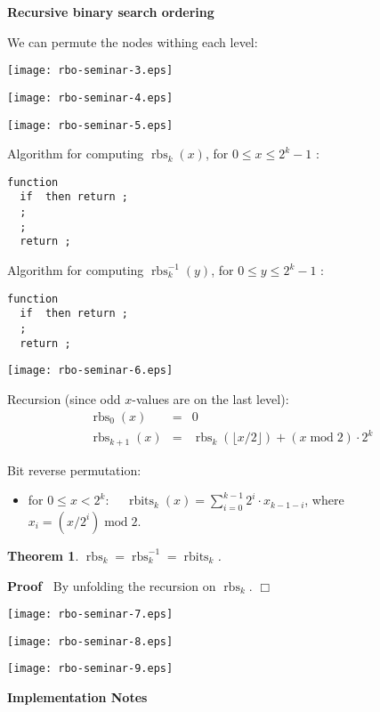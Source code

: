 \documentclass{letter}
\newcommand{\section}[1]{\medskip\bigskip

\noindent\textbf{\LARGE #1}}
\newcommand{\subsection}[1]{\medskip\bigskip

\noindent\textbf{\Large #1}}
\newcommand{\tmop}[1]{\ensuremath{\operatorname{#1}}}
\newenvironment{proof}{\noindent\textbf{Proof\ }}{\hspace*{\fill}$\Box$\medskip}
\newtheorem{theorem}{Theorem}
\begin{document}
\subsection{Recursive binary search ordering}

We can permute the nodes withing each level:

\texttt{[image: rbo-seminar-3.eps]}

\texttt{[image: rbo-seminar-4.eps]}

\texttt{[image: rbo-seminar-5.eps]}



Algorithm for computing $\tmop{rbs}_k (x)$, for $0 \leqslant x \leqslant 2^k -
1$ :
\begin{verbatim}
function 
  if  then return ;
  ;
  ;
  return ;
\end{verbatim}
Algorithm for computing $\tmop{rbs}_k^{- 1} (y)$, for $0 \leqslant y \leqslant
2^k - 1$ :
\begin{verbatim}
function 
  if  then return ;
  ;
  return ;
\end{verbatim}
\texttt{[image: rbo-seminar-6.eps]}



Recursion (since odd $x$-values are on the last level):
\begin{eqnarray*}
  \tmop{rbs}_0 (x) & = & 0\\
  \tmop{rbs}_{k + 1} (x) & = & \tmop{rbs}_k (\lfloor x / 2 \rfloor) + (x
  \tmop{mod} 2) \cdot 2^k
\end{eqnarray*}


Bit reverse permutation:
\begin{itemize}
  \item for $0 \leqslant x < 2^k$: \ \ $\tmop{rbits}_k (x) = \sum_{i = 0}^{k -
  1} 2^i \cdot x_{k - 1 - i}$, where $x_i = (x / 2^i) \tmop{mod} 2$.
\end{itemize}
\begin{theorem}
  $\tmop{rbs}_k = \tmop{rbs}_k^{- 1} = \tmop{rbits}_k$.
\end{theorem}

\begin{proof}
  By unfolding the recursion on $\tmop{rbs}_k$.
\end{proof}

\texttt{[image: rbo-seminar-7.eps]}

\texttt{[image: rbo-seminar-8.eps]}

\texttt{[image: rbo-seminar-9.eps]}



\section{Implementation Notes}
\end{document}

